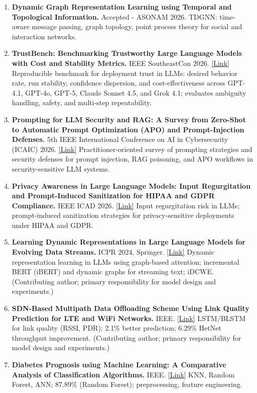 \documentclass[11pt,a4paper]{article}
\begin{document}
\begin{enumerate}[leftmargin=*,nosep]
  \item \textbf{Dynamic Graph Representation Learning using Temporal and Topological Information.} Accepted - ASONAM 2026. TDGNN: time-aware message passing, graph topology, point process theory for social and interaction networks.
  \item \textbf{TrustBench: Benchmarking Trustworthy Large Language Models with Cost and Stability Metrics.} IEEE SoutheastCon 2026. \href{https://doi.org/10.1109/SoutheastCon63549.2026.11476117}{[Link]} Reproducible benchmark for deployment trust in LLMs: desired behavior rate, run stability, confidence dispersion, and cost-effectiveness across GPT-4.1, GPT-4o, GPT-5, Claude Sonnet 4.5, and Grok 4.1; evaluates ambiguity handling, safety, and multi-step repeatability.
  \item \textbf{Prompting for LLM Security and RAG: A Survey from Zero-Shot to Automatic Prompt Optimization (APO) and Prompt-Injection Defenses.} 5th IEEE International Conference on AI in Cybersecurity (ICAIC) 2026. \href{https://ieeexplore.ieee.org/abstract/document/11395889}{[Link]} Practitioner-oriented survey of prompting strategies and security defenses for prompt injection, RAG poisoning, and APO workflows in security-sensitive LLM systems.
  \item \textbf{Privacy Awareness in Large Language Models: Input Regurgitation and Prompt-Induced Sanitization for HIPAA and GDPR Compliance.} IEEE ICAD 2026. \href{https://ieeexplore.ieee.org/abstract/document/11608900}{[Link]} Input regurgitation risk in LLMs; prompt-induced sanitization strategies for privacy-sensitive deployments under HIPAA and GDPR.
  \item \textbf{Learning Dynamic Representations in Large Language Models for Evolving Data Streams.} ICPR 2024, Springer. \href{https://link.springer.com/chapter/10.1007/978-3-031-78169-8_16}{[Link]} Dynamic representation learning in LLMs using graph-based attention; incremental BERT (iBERT) and dynamic graphs for streaming text; iDCWE. (Contributing author; primary responsibility for model design and experiments.)
  \item \textbf{SDN-Based Multipath Data Offloading Scheme Using Link Quality Prediction for LTE and WiFi Networks.} IEEE. \href{https://ieeexplore.ieee.org/abstract/document/10767139}{[Link]} LSTM/BLSTM for link quality (RSSI, PDR); 2.1\% better prediction; 6.29\% HetNet throughput improvement. (Contributing author; primary responsibility for model design and experiments.)
  \item \textbf{Diabetes Prognosis using Machine Learning: A Comparative Analysis of Classification Algorithms.} IEEE. \href{https://ieeexplore.ieee.org/abstract/document/9985487}{[Link]} KNN, Random Forest, ANN; 87.89\% (Random Forest); preprocessing, feature engineering.
\end{enumerate}
\vspace{4pt}
\end{document}
